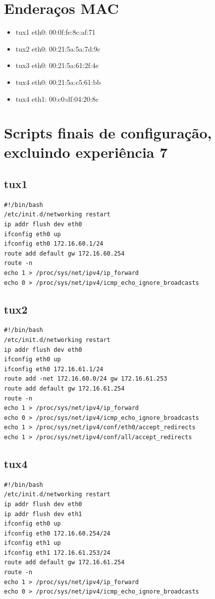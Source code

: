 \documentclass[11pt,a4paper,reqno]{report}
\numberwithin{equation}{section}
\begin{document}
\begin{appendices}

\chapter{Enderaços MAC}
\label{mac_addresses}
\begin{itemize} 
\item tux1 eth0: 00:0f:fe:8c:af:71
\item tux2 eth0: 00:21:5a:5a:7d:9c
\item tux3 eth0: 00:21:5a:61:2f:4e
\item tux4 eth0: 00:21:5a:c5:61:bb
\item tux4 eth1: 00:c0:df:04:20:8c
\end{itemize}

\chapter{Scripts finais de configuração, excluindo experiência 7}
\section{tux1}
\begin{verbatim}
#!/bin/bash
/etc/init.d/networking restart
ip addr flush dev eth0
ifconfig eth0 up
ifconfig eth0 172.16.60.1/24
route add default gw 172.16.60.254
route -n
echo 1 > /proc/sys/net/ipv4/ip_forward
echo 0 > /proc/sys/net/ipv4/icmp_echo_ignore_broadcasts
\end{verbatim}
\section{tux2}
\begin{verbatim}
#!/bin/bash
/etc/init.d/networking restart
ip addr flush dev eth0
ifconfig eth0 up
ifconfig eth0 172.16.61.1/24
route add -net 172.16.60.0/24 gw 172.16.61.253
route add default gw 172.16.61.254
route -n
echo 1 > /proc/sys/net/ipv4/ip_forward
echo 0 > /proc/sys/net/ipv4/icmp_echo_ignore_broadcasts
echo 1 > /proc/sys/net/ipv4/conf/eth0/accept_redirects
echo 1 > /proc/sys/net/ipv4/conf/all/accept_redirects
\end{verbatim}
\section{tux4}
\begin{verbatim}
#!/bin/bash
/etc/init.d/networking restart
ip addr flush dev eth0
ip addr flush dev eth1
ifconfig eth0 up
ifconfig eth0 172.16.60.254/24
ifconfig eth1 up
ifconfig eth1 172.16.61.253/24
route add default gw 172.16.61.254
route -n
echo 1 > /proc/sys/net/ipv4/ip_forward
echo 0 > /proc/sys/net/ipv4/icmp_echo_ignore_broadcasts
\end{verbatim}

\end{appendices}
\end{document}
